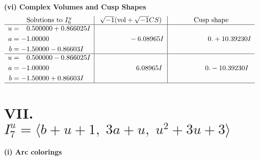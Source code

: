 \documentclass[1p]{elsarticle_modified}
\theoremstyle{definition}
\newcommand{\I}{\sqrt{-1}}
\begin{document}
\newpage\flushleft \textbf{(vi) Complex Volumes and Cusp Shapes}
$$\begin{array}{c|c|c}  
\text{Solutions to }I^u_{6}& \I (\text{vol} + \sqrt{-1}CS) & \text{Cusp shape}\\
 \hline 
\begin{aligned}
u &= \phantom{-}0.500000 + 0.866025 I \\
a &= -1.00000\phantom{ +0.000000I} \\
b &= -1.50000 - 0.86603 I\end{aligned}
 & \phantom{-0.000000 } -6.08965 I & \phantom{-0.000000 -}0. + 10.39230 I \\ \hline\begin{aligned}
u &= \phantom{-}0.500000 - 0.866025 I \\
a &= -1.00000\phantom{ +0.000000I} \\
b &= -1.50000 + 0.86603 I\end{aligned}
 & \phantom{-0.000000 -}6.08965 I & \phantom{-0.000000 } 0. - 10.39230 I\\
 \hline 
 \end{array}$$\newpage\newpage\renewcommand{\arraystretch}{1}
\centering \section*{VII. $I^u_{7}= \langle b+u+1,\;3 a+u,\;u^2+3 u+3 \rangle$}
\flushleft \textbf{(i) Arc colorings}\\
\end{document}

